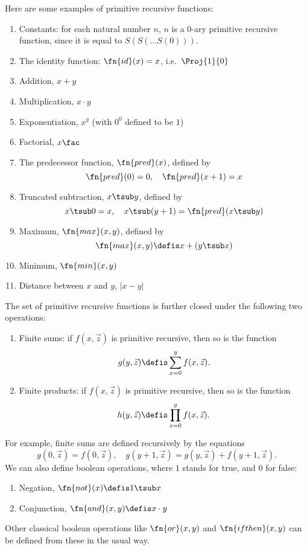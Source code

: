\documentclass[../../include/open-logic-section]{subfiles}
\begin{document}


Here are some examples of primitive recursive functions:
\begin{enumerate}
\item Constants: for each natural number $n$, $n$ is a 0-ary primitive
  recursive function, since it is equal to $S(S(\dots S(0)))$.

\item The identity function: $\fn{id}(x) = x$, i.e.\ $\Proj{1}{0}$

\item Addition, $x+y$

\item Multiplication, $x \cdot y$

\item Exponentiation, $x^y$ (with $0^0$ defined to be $1$)

\item Factorial, $x\fac$

\item The predecessor function, $\fn{pred}(x)$, defined by
\[
\fn{pred}(0) = 0, \quad \fn{pred}(x+1) = x
\]

\item Truncated subtraction, $x \tsub y$, defined by 
\[
x \tsub 0 = x, \quad x \tsub (y+1) = \fn{pred}(x \tsub y)
\]

\item Maximum, $\fn{max}(x,y)$, defined by 
\[
\fn{max}(x,y) \defis x + (y \tsub x)
\]

\item Minimum, $\fn{min}(x,y)$

\item Distance between $x$ and $y$, $\left|x-y\right|$
\end{enumerate}

The set of primitive recursive functions is further closed under the
following two operations:
\begin{enumerate}
\item Finite sums: if $f(x,\vec z)$ is primitive recursive, then so is the
function 
\[
g(y,\vec z) \defis \sum_{x = 0}^y f(x,\vec z).
\]
\item Finite products: if $f(x,\vec z)$ is primitive recursive, then so is the
function 
\[
h(y,\vec z) \defis \prod_{x = 0}^y f(x,\vec z).
\]
\end{enumerate}
For example, finite sums are defined recursively by the equations
\[
g(0,\vec z) = f(0,\vec z), \quad g(y+1,\vec z) = g(y,\vec z) +
f(y+1,\vec z).
\]
We can also define boolean operations, where $1$ stands for true, and
$0$ for false:
\begin{enumerate}
\item Negation, $\fn{not}(x) \defis 1 \tsub x$
\item Conjunction, $\fn{and}(x,y) \defis x \cdot y$
\end{enumerate}
Other classical boolean operations like $\fn{or}(x,y)$ and
$\fn{ifthen}(x,y)$ can be defined from these in the usual way.
\end{document}
